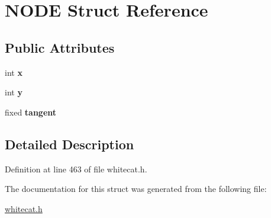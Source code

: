 \hypertarget{structNODE}{\section{N\-O\-D\-E Struct Reference}
\label{structNODE}
}
\subsection*{Public Attributes}
\begin{DoxyCompactItemize}
\item 
\hypertarget{structNODE_ae491648fdefa758c04fd1b39997dfe44}{int {\bfseries x}}\label{structNODE_ae491648fdefa758c04fd1b39997dfe44}

\item 
\hypertarget{structNODE_a1c83ccf922c1655a4f4cc90fb7455670}{int {\bfseries y}}\label{structNODE_a1c83ccf922c1655a4f4cc90fb7455670}

\item 
\hypertarget{structNODE_ab9675cd84cb7ccf6e2506c7ee233fa2c}{fixed {\bfseries tangent}}\label{structNODE_ab9675cd84cb7ccf6e2506c7ee233fa2c}

\end{DoxyCompactItemize}


\subsection{Detailed Description}


Definition at line 463 of file whitecat.\-h.



The documentation for this struct was generated from the following file\-:\begin{DoxyCompactItemize}
\item 
\hyperlink{whitecat_8h}{whitecat.\-h}\end{DoxyCompactItemize}
